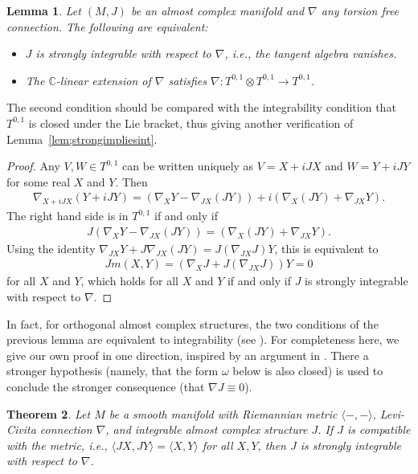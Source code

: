 \documentclass[pdftex]{sigma}
\newtheorem{thm}{Theorem}[section]
\newtheorem{lem}[thm]{Lemma}
\numberwithin{equation}{section}
\newcommand{\CC}{\mathbb{C}}
\begin{document}
\begin{lem} \label{lem:strongintequiv}
Let $(M,J)$ be an almost complex manifold and $\nabla$ any torsion free connection. The following are equivalent:
\begin{itemize}\itemsep=0pt
\item $J$ is strongly integrable with respect to $\nabla$, i.e., the tangent algebra vanishes.
\item The $\CC$-linear extension of $\nabla$ satisfies $\nabla\colon T^{0,1} \otimes T^{0,1} \to T^{0,1}$.
\end{itemize}
\end{lem}

The second condition should be compared with the integrability condition that $T^{0,1}$ is closed under the Lie bracket, thus giving another verification of Lemma~\ref{lem;strongimpliesint}.

\begin{proof}Any $V,W \in T^{0,1}$ can be written uniquely as $V = X + iJX$ and $W = Y + iJY$ for some real $X$ and $Y$. Then
\begin{gather*}
\nabla_{X+ iJX} (Y + i JY) = (\nabla_X Y - \nabla_{JX} (JY) ) + i (\nabla_X (JY) + \nabla_{JX} Y ).
\end{gather*}
The right hand side is in $ T^{0,1}$ if and only if
\begin{gather*}
J (\nabla_X Y - \nabla_{JX} (JY) ) = (\nabla_X (JY) + \nabla_{JX} Y ).
\end{gather*}
Using the identity $\nabla_{JX} Y + J\nabla_{JX} (JY) = J ( \nabla_{JX} J ) Y$, this is equivalent to
\begin{gather*}
Jm(X,Y)= ( \nabla_X J +J ( \nabla_{JX} J ) ) Y = 0
\end{gather*}
for all $X$ and $Y$, which holds for all $X$ and $Y$ if and only if $J$ is strongly integrable with respect to $\nabla$.
\end{proof}

In fact, for orthogonal almost complex structures, the two conditions of the previous lemma are equivalent to integrability (see \cite[p.~267]{S}). For completeness here, we give our own proof in one direction, inspired by an argument in \cite[Appendix~C.7]{McS}. There a stronger hypothesis (namely, that the form $\omega$ below is also closed) is used to conclude the stronger consequence (that $\nabla J \equiv 0$).

\begin{thm} \label{thm;Jintorth} Let $M$ be a smooth manifold with Riemannian metric $\langle - ,- \rangle$, Levi-Civita connection $\nabla$, and integrable almost complex structure $J$. If $J$ is compatible with the metric, i.e., $\langle JX,JY \rangle = \langle X,Y \rangle $ for all $X,Y$, then $J$ is strongly integrable with respect to $\nabla$.
\end{thm}
\end{document}
